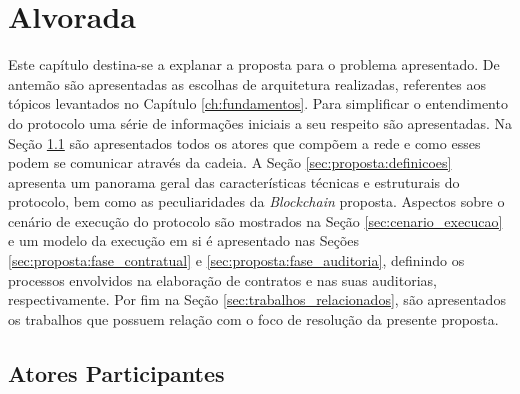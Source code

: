 \chapter{Alvorada}
\label{ch:proposta}

Este capítulo destina-se a explanar a proposta para o problema apresentado. De antemão são apresentadas as escolhas de arquitetura realizadas, referentes aos tópicos levantados no Capítulo \ref{ch:fundamentos}. Para simplificar o entendimento do protocolo uma série de informações iniciais a seu respeito são apresentadas. Na Seção \ref{sec:proposta:atores} são apresentados todos os atores que compõem a rede e como esses podem se comunicar através da cadeia. A Seção \ref{sec:proposta:definicoes} apresenta um panorama geral das características técnicas e estruturais do protocolo, bem como as peculiaridades da \textit{Blockchain} proposta. Aspectos sobre o cenário de execução do protocolo são mostrados na Seção \ref{sec:cenario_execucao} e um modelo da execução em si é apresentado nas Seções \ref{sec:proposta:fase_contratual} e \ref{sec:proposta:fase_auditoria}, definindo os processos envolvidos na elaboração de contratos e nas suas auditorias, respectivamente. Por fim na Seção \ref{sec:trabalhos_relacionados}, são apresentados os trabalhos que possuem relação com o foco de resolução da presente proposta.




%
\section{Atores Participantes}
\label{sec:proposta:atores}

